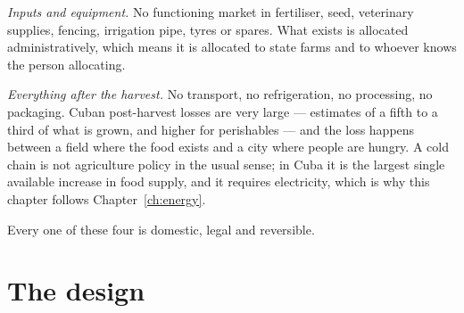 \emph{Inputs and equipment.} No functioning market in fertiliser, seed,
veterinary supplies, fencing, irrigation pipe, tyres or spares. What exists is
allocated administratively, which means it is allocated to state farms and to
whoever knows the person allocating.

\emph{Everything after the harvest.} No transport, no refrigeration, no
processing, no packaging. Cuban post-harvest losses are very large --- estimates
of a fifth to a third of what is grown, and higher for perishables --- and the
loss happens between a field where the food exists and a city where people are
hungry.\unv{} A cold chain is not agriculture policy in the usual sense; in Cuba
it is the largest single available increase in food supply, and it requires
electricity, which is why this chapter follows Chapter~\ref{ch:energy}.

Every one of these four is domestic, legal and reversible.

\section{The design}

